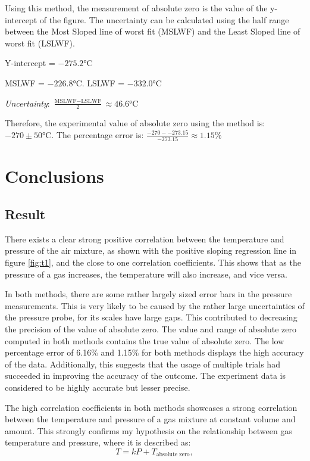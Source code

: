 \documentclass[a4paper,12pt]{article}
\begin{document}
Using this method, the measurement of absolute zero is the value of the y-intercept of the figure. The uncertainty can be calculated using the half range between the Most Sloped line of worst fit (MSLWF) and the Least Sloped line of worst fit (LSLWF).

Y-intercept = $-275.2\si{\celsius}$

MSLWF = $-226.8\si{\celsius}$. LSLWF = $-332.0\si{\celsius}$

\textit{Uncertainty}: $\frac{\text{MSLWF} - \text{LSLWF}}{2} \approx 46.6 \si{\celsius}$

Therefore, the experimental value of absolute zero using the method is: $-270 \pm 50 \si{\celsius}$. The percentage error is: $\frac{-270 - -273.15}{-273.15} \approx 1.15\%$

\section{Conclusions}
\subsection{Result}
There exists a clear strong positive correlation between the temperature and pressure of the air mixture, as shown with the positive sloping regression line in figure \ref{fig:t1}, and the close to one correlation coefficients. This shows that as the pressure of a gas increases, the temperature will also increase, and vice versa.

In both methods, there are some rather largely sized error bars in the pressure measurements. This is very likely to be caused by the rather large uncertainties of the pressure probe, for its scales have large gaps. This contributed to decreasing the precision of the value of absolute zero.
The value and range of absolute zero computed in both methods contains the true value of absolute zero. The low percentage error of 6.16\% and 1.15\% for both methods displays the high accuracy of the data. Additionally, this suggests that the usage of multiple trials had succeeded in improving the accuracy of the outcome. The experiment data is considered to be highly accurate but lesser precise.

The high correlation coefficients in both methods showcases a strong correlation between the temperature and pressure of a gas mixture at constant volume and amount. This strongly confirms my hypothesis on the relationship between gas temperature and pressure, where it is described as:
\[
    T = kP + T_{\text{absolute zero}},
\]
\end{document}
